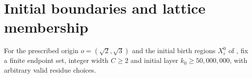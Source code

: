 \section{Initial boundaries and lattice membership}
\label{sec:area_law_initial_region_boundaries}

For the prescribed origin $o=(\sqrt2,\sqrt3)$ and the initial
birth regions $X_i^0$ of \cite[Section~11]{OpenAI2026AreaLaw}, fix a
finite endpoint set, integer width $C\ge 2$ and initial layer
$k_0\ge 50{,}000{,}000$, with arbitrary valid residue choices.


